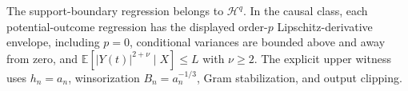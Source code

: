 The support-boundary regression belongs to \(\mathcal H^q\).  In the causal class, each potential-outcome regression has the displayed order-\(p\) Lipschitz-derivative envelope, including \(p=0\), conditional variances are bounded above and away from zero, and \(\mathbb E[|Y(t)|^{2+\nu}\mid X]\leq L\) with \(\nu\geq2\).  The explicit upper witness uses \(h_n=a_n\), winsorization \(B_n=a_n^{-1/3}\), Gram stabilization, and output clipping.